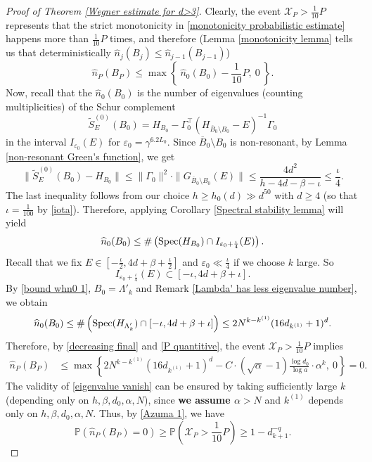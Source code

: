 \documentclass[11pt,reqno,UTF8,twoside]{amsart}
\newcommand{\spec}{{\rm Spec}}
\renewcommand{\P}{\mathbb{P}}
\newcommand{\mcX}{\mathcal{X}}
\newcommand{\whn}{\widehat{n}}
\newcommand{\barB}{\overline{B}}
\theoremstyle{definition}
\numberwithin{equation}{section}
\begin{document}
\begin{proof}[Proof of Theorem \ref{Wegner estimate for d>3}]
Clearly, the event $\mcX_P > \frac{1}{10}P$ represents  that the strict monotonicity in \eqref{monotonicity probabilistic estimate} happens more than $\frac{1}{10}P$ times, and therefore (Lemma \ref{monotonicity lemma} tells us that deterministically $\whn_{j}(B_j)\leq \whn_{j-1}(B_{j-1})$)
\begin{equation}\label{decreasing final}
  \whn_P(B_P)\leq \max\left\{ \ \whn_0(B_0)-\frac{1}{10}P, \ 0 \ \right\}.
\end{equation}
Now, recall that the $\whn_0(B_0)$ is the number of eigenvalues (counting multiplicities) of the Schur complement 
 \begin{equation}\label{schur complement in 0-step}
  \widetilde{S}^{(0)}_E (B_0)= H_{B_0}-\Gamma_0^{\top}(H_{\barB_0\setminus B_0}-E)^{-1}\Gamma_0
\end{equation}
in the interval $I_{\varepsilon_0}(E)$ for  $\varepsilon_0=\gamma^{6.2L_0}$. Since $\barB_0\setminus B_0$ is non-resonant, by Lemma \ref{non-resonant Green's function},  we get  
\[\| \widetilde{S}^{(0)}_E (B_0)- H_{B_0}  \|\leq \| \Gamma_0\|^2\cdot \|G_{\barB_0\setminus B_0}(E) \|\leq \frac{4d^2}{h-4d-\beta-\iota}\leq \frac{\iota}{4}. \]
The last inequality follows from our choice $h\geq h_0(d)\gg d^{50}$ with $d\geq 4$ (so that $\iota=\frac{1}{100}$ by \eqref{iota}). Therefore, applying Corollary \ref{Spectral stability lemma} will yield 
\begin{equation}\label{bound whn0 1}
  \whn_0(B_0)\leq \#\left( \spec(H_{B_0})\cap I_{\varepsilon_0+\frac{\iota}{4}}(E) \right).
\end{equation}
Recall that we fix  $E\in [-\frac{\iota}{2},4d+\beta+\frac{\iota}{2}]$ and $\varepsilon_0\ll \frac{\iota}{4} $ if we choose $k$ large. So
\[I_{\varepsilon_0+\frac{\iota}{4}}(E) \subset [-\iota,4d+\beta+\iota].\]
By \eqref{bound whn0 1}, $B_0=\Lambda'_k$ and Remark \ref{Lambda' has less eigenvalue number}, we obtain 
\begin{equation}\label{bound whn0 2}
  \whn_0(B_0)\leq \# \left(  \spec(H_{\Lambda'_k})\cap [-\iota,4d+\beta+\iota] \right) \leq 2 N^{k-k^{(1)}} (16d_{k^{(1)}}+1)^d. 
\end{equation}
Therefore, by \eqref{decreasing final} and \eqref{P quantitive}, the event $\mcX_P > \frac{1}{10}P$ implies 
\begin{align}\label{eigenvalue vanish}
  \whn_P(B_P) & \leq \max \left\{ 2 N^{k-k^{(1)}} (16d_{k^{(1)}}+1)^d - C\cdot(\sqrt{\alpha}-1)\frac{\log d_0}{\log a} \cdot \alpha^k ,\ 0\right\} =0.
\end{align}
The validity of \eqref{eigenvalue vanish} can be ensured by taking sufficiently large $k$ (depending only  on $h,\beta,d_0,\alpha,N$), since {\textbf{we assume $\alpha>N$}} and $k^{(1)}$ depends only on $h,\beta,d_0,\alpha,N$. Thus, by \eqref{Azuma 1},  we have  
\begin{equation}
  \P\left(\whn_P(B_P) =0 \right) \geq \P(\mcX_P > \frac{1}{10}P)\geq 1-d_{k+1}^{-q}.
\end{equation}



\end{proof}
\end{document}
